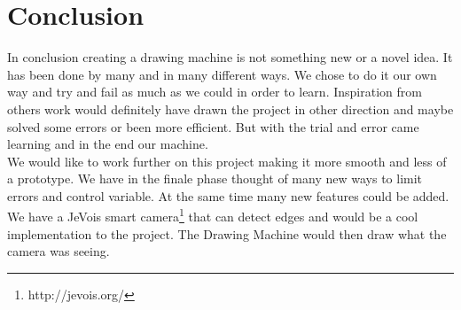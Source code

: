 
\section{Conclusion}
In conclusion creating a drawing machine is not something new or a novel idea. It has been done by many and in many different ways. We chose to do it our own way and try and fail as much as we could in order to learn. Inspiration from others work would definitely have drawn the project in other direction and maybe solved some errors or been more efficient. But with the trial and error came learning and in the end our machine.\\
We would like to work further on this project making it more smooth and less of a prototype. We have in the finale phase thought of many new ways to limit errors and control variable. At the same time many new features could be added. We have a JeVois smart camera\footnote{http://jevois.org/} that can detect edges and would be a cool implementation to the project. The Drawing Machine would then draw what the camera was seeing. 
